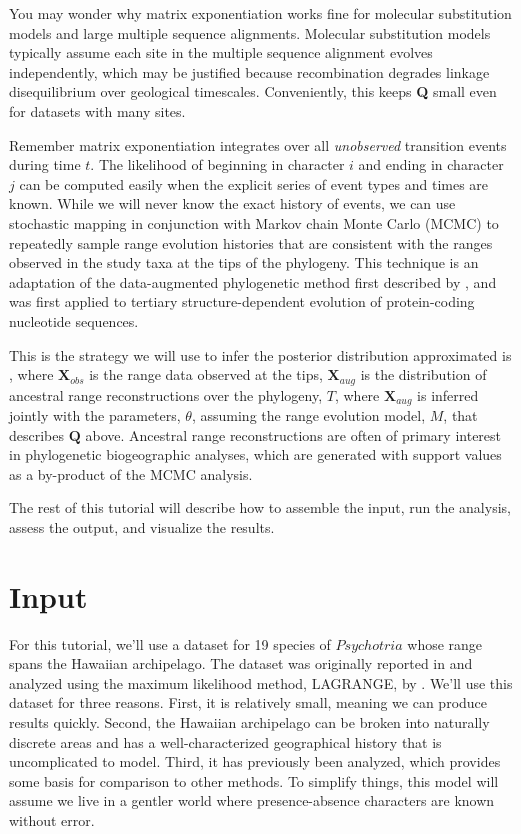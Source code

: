 You may wonder why matrix exponentiation works fine for molecular substitution models and large multiple sequence alignments.
Molecular substitution models typically assume each site in the multiple sequence alignment evolves independently, which may be justified because recombination degrades linkage disequilibrium over geological timescales.
Conveniently, this keeps \textbf{Q} small even for datasets with many sites.

Remember matrix exponentiation integrates over all \textit{unobserved} transition events during time $t$.
The likelihood of beginning in character $i$ and ending in character $j$ can be computed easily when the explicit series of event types and times are known.
While we will never know the exact history of events, we can use stochastic mapping in conjunction with Markov chain Monte Carlo (MCMC) to repeatedly sample range evolution histories that are consistent with the ranges observed in the study taxa at the tips of the phylogeny.
This technique is an adaptation of the data-augmented phylogenetic method first described by \citet{robinson03}, and was first applied to tertiary structure-dependent evolution of protein-coding nucleotide sequences.

This is the strategy we will use to infer the posterior distribution approximated is 
, where $\textbf{X}_{obs}$ is the range data observed at the tips, $\textbf{X}_{aug}$ is the distribution of ancestral range reconstructions over the phylogeny, $T$, where $\textbf{X}_{aug}$ is inferred jointly with the parameters, $\theta$, assuming the range evolution model, $M$, that describes $\textbf{Q}$ above.
Ancestral range reconstructions are often of primary interest in phylogenetic biogeographic analyses, which are generated with support values as a by-product of the MCMC analysis.

The rest of this tutorial will describe how to assemble the input, run the analysis, assess the output, and visualize the results.

\newpage

\section{Input}

For this tutorial, we'll use a dataset for 19 species of $Psychotria$ whose range spans the Hawaiian archipelago.
The dataset was originally reported in \citet{nepokroeff03} and analyzed using the maximum likelihood method, LAGRANGE, by \citet{ree08}.
We'll use this dataset for three reasons.
First, it is relatively small, meaning we can produce results quickly.
Second, the Hawaiian archipelago can be broken into naturally discrete areas and has a well-characterized geographical history that is uncomplicated to model.
Third, it has previously been analyzed, which provides some basis for comparison to other methods.
To simplify things, this model will assume we live in a gentler world where presence-absence characters are known without error.

